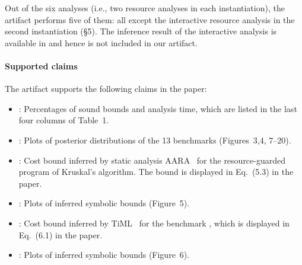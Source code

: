 Out of the six analyses (i.e., two resource analyses in each instantiation), the
artifact performs five of them: all except the interactive resource analysis in
the second instantiation (\S5).
%
The inference result of the interactive analysis is available in
\citet{Chargueraud2019} and hence is not included in our artifact.

\paragraph{Supported claims}

The artifact supports the following claims in the paper:
\begin{itemize}
  \item {}: Percentages of sound bounds
        and analysis time, which are listed in the last four columns of Table~1.
  \item {}: Plots of posterior
        distributions of the 13 benchmarks (Figures~3,4, 7--20).
  \item {}: Cost bound inferred by static
        analysis AARA~\citep{Hoffmann2011a,Hoffmann2017} for the
        resource-guarded program of Kruskal's algorithm.
        The bound is displayed in Eq.~(5.3) in the paper.
  \item {}: Plots of inferred symbolic
        bounds (Figure~5).
  \item {}: Cost bound inferred by
        TiML~\citep{WangWC17} for the benchmark \quicksorttiml{}, which is
        displayed in Eq.~(6.1) in the paper.
  \item {}: Plots of inferred symbolic
        bounds (Figure~6).
\end{itemize}
